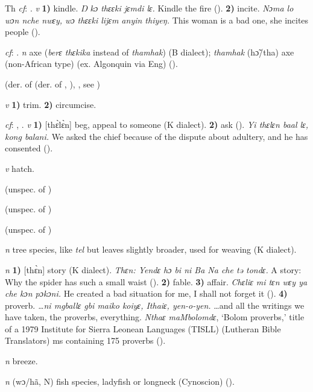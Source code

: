 \begin{letter}{Th}
 \textit{cf}: . \textit{v} \textbf{1)} kindle. \textit{Ŋ kɔ thɛɛki jɛmdi lɛ.} Kindle the fire (\citealt{Pichl1967}). \textbf{2)} incite. \textit{Nɔma lo wɔn nche nwɛy, wɔ thɛɛki lijɛm anyin thiyeŋ.} This woman is a bad one, she incites people (\citealt{Pichl1967}). 

 \textit{cf}: . \textit{n} axe (\textit{berɛ thɛkika} instead of \textit{thamhak}) (B dialect); \textit{thamhak} (hɔ̃/tha) axe (non-African type) (ex. Algonquin via Eng) (\citealt{Pichl1967}).

 (der. of  (der. of , ), , see ) 

 \textit{v} \textbf{1)} trim. \textbf{2)} circumcise.

 \textit{cf}: , . \textit{v} \textbf{1)} [thɛ̀lɛ̀n] beg, appeal to someone (K dialect). \textbf{2)} ask (\citealt{Pichl1967}). \textit{Yi thɛlɛn baal lɛ, kong balani.} We asked the chief because of the dispute about adultery, and he has consented (\citealt{Pichl1967}). 

 \textit{v} hatch.

 (unspec. of ) 

 (unspec. of ) 

 (unspec. of ) 

 \textit{n} tree species, like \textit{tel} but leaves slightly broader, used for weaving (K dialect). 

 \textit{n} \textbf{1)} [thɛ̀n] story (K dialect). \textit{Thɛn: Yendɛ hɔ bi ni Ba Na che tə tondɛ.} A story: Why the spider has such a small waist (\citealt{Sumner1921}). \textbf{2)} fable. \textbf{3)} affair. \textit{Chɛliɛ mi tɛn wɛy ya che kɔn pɔkɔni.} He created a bad situation for me, I shall not forget it (\citealt{Pichl1967}). \textbf{4)} proverb. \textit{…ni mgballɛ gbi maiko koiyɛ, Ithaiɛ, yen-o-yen.} …and all the writings we have taken, the proverbs, everything. \textit{Nthaɛ maMbolomdɛ}, ‘Bolom proverbs,' title of a 1979 Institute for Sierra Leonean Languages (TISLL) (Lutheran Bible Translators) ms containing 175 proverbs (\citealt{TISLL1979}).

 \textit{n} breeze.

 \textit{n} (wɔ/hã, N) fish species, ladyfish or longneck (Cynoscion) (\citealt{Pichl1967}). 


\end{letter}
